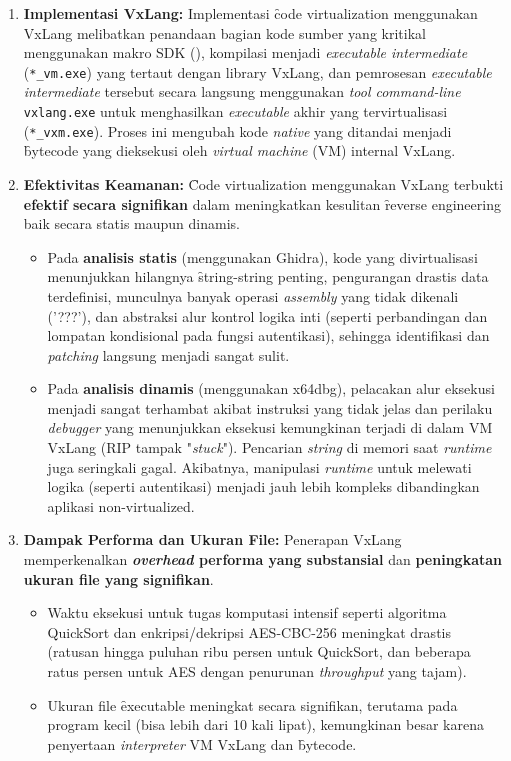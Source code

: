 \begin{enumerate}
    \item \textbf{Implementasi VxLang:} Implementasi \f{code virtualization} menggunakan VxLang melibatkan penandaan bagian kode sumber yang kritikal menggunakan makro SDK (), kompilasi menjadi \textit{executable intermediate} (\texttt{*\_vm.exe}) yang tertaut dengan library VxLang, dan pemrosesan \textit{executable intermediate} tersebut secara langsung menggunakan \textit{tool command-line} \texttt{vxlang.exe} untuk menghasilkan \textit{executable} akhir yang tervirtualisasi (\texttt{*\_vxm.exe}). Proses ini mengubah kode \textit{native} yang ditandai menjadi \f{bytecode} yang dieksekusi oleh \textit{virtual machine} (VM) internal VxLang.

    \item \textbf{Efektivitas Keamanan:} \f{Code virtualization} menggunakan VxLang terbukti \textbf{efektif secara signifikan} dalam meningkatkan kesulitan \f{reverse engineering} baik secara statis maupun dinamis.
        \begin{itemize}
            \item Pada \textbf{analisis statis} (menggunakan Ghidra), kode yang divirtualisasi menunjukkan hilangnya \f{string-string} penting, pengurangan drastis data terdefinisi, munculnya banyak operasi \textit{assembly} yang tidak dikenali ('???'), dan abstraksi alur kontrol logika inti (seperti perbandingan dan lompatan kondisional pada fungsi autentikasi), sehingga identifikasi dan \textit{patching} langsung menjadi sangat sulit.
            \item Pada \textbf{analisis dinamis} (menggunakan x64dbg), pelacakan alur eksekusi menjadi sangat terhambat akibat instruksi yang tidak jelas dan perilaku \textit{debugger} yang menunjukkan eksekusi kemungkinan terjadi di dalam VM VxLang (RIP tampak "\textit{stuck}"). Pencarian \textit{string} di memori saat \textit{runtime} juga seringkali gagal. Akibatnya, manipulasi \textit{runtime} untuk melewati logika (seperti autentikasi) menjadi jauh lebih kompleks dibandingkan aplikasi non-virtualized.
        \end{itemize}

    \item \textbf{Dampak Performa dan Ukuran File:} Penerapan VxLang memperkenalkan \textbf{\textit{overhead} performa yang substansial} dan \textbf{peningkatan ukuran file yang signifikan}.
        \begin{itemize}
            \item Waktu eksekusi untuk tugas komputasi intensif seperti algoritma QuickSort dan enkripsi/dekripsi AES-CBC-256 meningkat drastis (ratusan hingga puluhan ribu persen untuk QuickSort, dan beberapa ratus persen untuk AES dengan penurunan \textit{throughput} yang tajam).
            \item Ukuran file \f{executable} meningkat secara signifikan, terutama pada program kecil (bisa lebih dari 10 kali lipat), kemungkinan besar karena penyertaan \textit{interpreter} VM VxLang dan \f{bytecode}.
        \end{itemize}


\end{enumerate}
